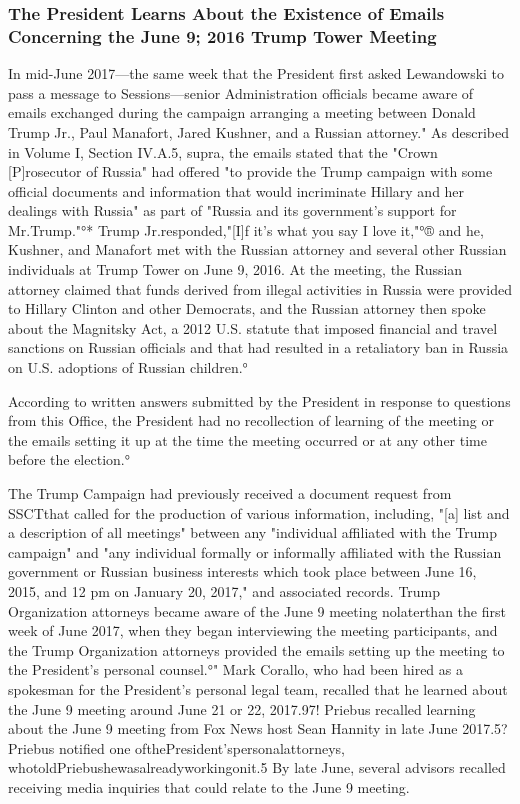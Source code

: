 \subsubsection{The President Learns About the Existence of Emails Concerning the June 9; 2016 Trump Tower Meeting}

In mid-June 2017—the same week that the President first asked Lewandowski to pass a message to Sessions—senior Administration officials became aware of emails exchanged during the campaign arranging a meeting between Donald Trump Jr., Paul Manafort, Jared Kushner, and a Russian attorney."
As described in Volume I, Section IV.A.5, supra, the emails stated that the "Crown [P]rosecutor of Russia" had offered "to provide the Trump campaign with some official documents and information that would incriminate Hillary and her dealings with Russia" as part of "Russia and its government's support for Mr.Trump."°*
Trump Jr.responded,"[I]f it's what you say I love it,"°®
and he, Kushner, and Manafort met with the Russian attorney and several other Russian individuals at Trump Tower on June 9, 2016.%
At the meeting, the Russian attorney claimed that funds derived from illegal activities in Russia were provided to Hillary Clinton and other Democrats, and the Russian attorney then spoke about the Magnitsky Act, a 2012 U.S. statute that imposed financial and travel sanctions on Russian officials and that had resulted in a retaliatory ban in Russia on U.S. adoptions of Russian children.°

According to written answers submitted by the President in response to questions from this Office, the President had no recollection of learning of the meeting or the emails setting it up at the time the meeting occurred or at any other time before the election.°

The Trump Campaign had previously received a document request from SSCTthat called for the production of various information, including, "[a] list and a description of all meetings" between any "individual affiliated with the Trump campaign" and "any individual formally or informally affiliated with the Russian government or Russian business interests which took place between June 16, 2015, and 12 pm on January 20, 2017," and associated records.%
Trump Organization attorneys became aware of the June 9 meeting nolaterthan the first week of June 2017, when they began interviewing the meeting participants, and the Trump Organization attorneys provided the emails setting up the meeting to the President's personal counsel.°"
Mark Corallo, who had been hired as a spokesman for the President's personal legal team, recalled that he learned about the June 9 meeting around June 21 or 22, 2017.97!
Priebus recalled learning about the June 9 meeting from Fox News host Sean Hannity in late June 2017.5?
Priebus notified one ofthePresident'spersonalattorneys, whotoldPriebushewasalreadyworkingonit.5
By late June, several advisors recalled receiving media inquiries that could relate to the June 9 meeting. %

